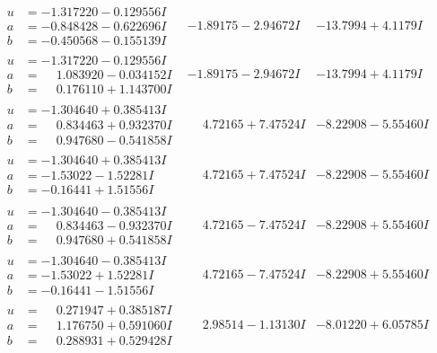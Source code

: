 \documentclass[1p]{elsarticle_modified}
\theoremstyle{definition}
\begin{document}
$$\begin{array}{c|c|c}
\begin{aligned}
u &= -1.317220 - 0.129556 I \\
a &= -0.848428 - 0.622696 I \\
b &= -0.450568 - 0.155139 I\end{aligned}
 & -1.89175 - 2.94672 I & -13.7994 + 4.1179 I \\ \hline\begin{aligned}
u &= -1.317220 - 0.129556 I \\
a &= \phantom{-}1.083920 - 0.034152 I \\
b &= \phantom{-}0.176110 + 1.143700 I\end{aligned}
 & -1.89175 - 2.94672 I & -13.7994 + 4.1179 I \\ \hline\begin{aligned}
u &= -1.304640 + 0.385413 I \\
a &= \phantom{-}0.834463 + 0.932370 I \\
b &= \phantom{-}0.947680 - 0.541858 I\end{aligned}
 & \phantom{-}4.72165 + 7.47524 I & -8.22908 - 5.55460 I \\ \hline\begin{aligned}
u &= -1.304640 + 0.385413 I \\
a &= -1.53022 - 1.52281 I \\
b &= -0.16441 + 1.51556 I\end{aligned}
 & \phantom{-}4.72165 + 7.47524 I & -8.22908 - 5.55460 I \\ \hline\begin{aligned}
u &= -1.304640 - 0.385413 I \\
a &= \phantom{-}0.834463 - 0.932370 I \\
b &= \phantom{-}0.947680 + 0.541858 I\end{aligned}
 & \phantom{-}4.72165 - 7.47524 I & -8.22908 + 5.55460 I \\ \hline\begin{aligned}
u &= -1.304640 - 0.385413 I \\
a &= -1.53022 + 1.52281 I \\
b &= -0.16441 - 1.51556 I\end{aligned}
 & \phantom{-}4.72165 - 7.47524 I & -8.22908 + 5.55460 I \\ \hline\begin{aligned}
u &= \phantom{-}0.271947 + 0.385187 I \\
a &= \phantom{-}1.176750 + 0.591060 I \\
b &= \phantom{-}0.288931 + 0.529428 I\end{aligned}
 & \phantom{-}2.98514 - 1.13130 I & -8.01220 + 6.05785 I \\ \hline\begin{aligned}

\end{aligned}
\end{array}$$
\end{document}

